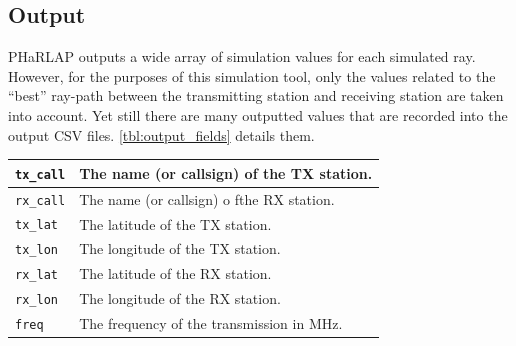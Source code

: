 \documentclass[12pt,letterpaper]{article}
\begin{document}
\subsection{Output}
\label{sec:usage:output}

PHaRLAP outputs a wide array of simulation values for each simulated
ray. However, for the purposes of this simulation tool, only the values related
to the ``best'' ray-path between the transmitting station and receiving station
are taken into account. Yet still there are many outputted values that are
recorded into the output CSV files. \autoref{tbl:output_fields} details them.

\begin{table}
  \centering

  \begin{tabulary}{\textwidth}{| L | p{20em} |}
    \hline
    
    {\tt tx\_call} & The name (or callsign) of the TX station.\\\hline
    {\tt rx\_call} & The name (or callsign) o fthe RX station.\\\hline
    {\tt tx\_lat} & The latitude of the TX station.\\\hline
    {\tt tx\_lon} & The longitude of the TX station.\\\hline
    {\tt rx\_lat} & The latitude of the RX station.\\\hline
    {\tt rx\_lon} & The longitude of the RX station.\\\hline
    {\tt freq} & The frequency of the transmission in $\si{\mega\hertz}$.\\\hline


\end{tabulary}
\end{table}
\end{document}
